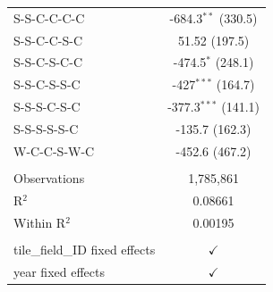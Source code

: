 \begin{table}[H]
\begin{tabular}{lc}
      S-S-C-C-C-C                      & -684.3$^{**}$ (330.5)\\   
      S-S-C-C-S-C                      & 51.52 (197.5)\\   
      S-S-C-S-C-C                      & -474.5$^{*}$ (248.1)\\   
      S-S-C-S-S-C                      &  -427$^{***}$ (164.7)\\   
      S-S-S-C-S-C                      & -377.3$^{***}$ (141.1)\\   
      S-S-S-S-S-C                      & -135.7 (162.3)\\   
      W-C-C-S-W-C                      & -452.6 (467.2)\\   
       \\
      Observations                     & 1,785,861\\  
      R$^2$                            & 0.08661\\  
      Within R$^2$                     & 0.00195\\  
       \\
      tile\_field\_ID fixed effects  & $\checkmark$\\   
      year fixed effects               & $\checkmark$\\   
      \bottomrule
   \end{tabular}
\end{table}


